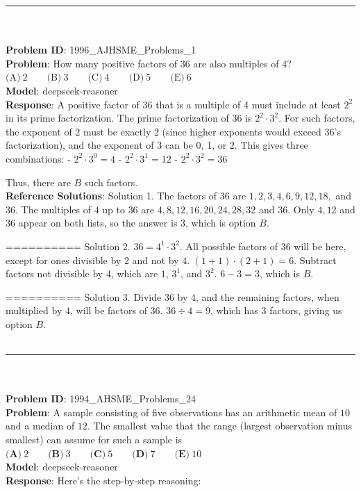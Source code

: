     \hrule \\
    \vspace{0.5cm} \\
    \textbf{Problem ID}: 1996_AJHSME_Problems_1 \\
    \textbf{Problem}: How many positive factors of 36 are also multiples of 4?
$\text{(A)}\ 2 \qquad \text{(B)}\ 3 \qquad \text{(C)}\ 4 \qquad \text{(D)}\ 5 \qquad \text{(E)}\ 6$ \\
    \textbf{Model}: deepseek-reasoner \\
    \textbf{Response}: A positive factor of 36 that is a multiple of 4 must include at least \(2^2\) in its prime factorization. The prime factorization of 36 is \(2^2 \cdot 3^2\). For such factors, the exponent of 2 must be exactly 2 (since higher exponents would exceed 36's factorization), and the exponent of 3 can be 0, 1, or 2. This gives three combinations:  
- \(2^2 \cdot 3^0 = 4\)  
- \(2^2 \cdot 3^1 = 12\)  
- \(2^2 \cdot 3^2 = 36\)  

Thus, there are \(\boxed{B}\) such factors. \\
    \textbf{Reference Solutions}: Solution 1. The factors of $36$ are $1, 2, 3, 4, 6, 9, 12, 18,$ and $36$.
The multiples of $4$ up to $36$ are $4, 8, 12, 16, 20, 24, 28, 32$ and $36$.
Only $4, 12$ and $36$ appear on both lists, so the answer is $3$, which is option $\boxed{B}$.


==========
Solution 2. $36 = 4^1 \cdot 3^2$. All possible factors of $36$ will be here, except for ones divisible by $2$ and not by $4$. $(1+1)\cdot (2+1) = 6$. Subtract factors not divisible by $4$, which are $1$, $3^1$, and $3^2$. $6-3=3$, which is $\boxed{B}$.


==========
Solution 3. Divide $36$ by $4$, and the remaining factors, when multiplied by $4$, will be factors of $36$.
$36 \div 4 = 9$, which has $3$ factors, giving us option $\boxed{B}$. \\
    \vspace{0.3cm} \\
    \hrule \\
    \vspace{0.5cm} \\
    \textbf{Problem ID}: 1994_AHSME_Problems_24 \\
    \textbf{Problem}: A sample consisting of five observations has an arithmetic mean of $10$ and a median of $12$. The smallest value that the range (largest observation minus smallest) can assume for such a sample is
$\textbf{(A)}\ 2 \qquad\textbf{(B)}\ 3 \qquad\textbf{(C)}\ 5 \qquad\textbf{(D)}\ 7 \qquad\textbf{(E)}\ 10$ \\
    \textbf{Model}: deepseek-reasoner \\
    \textbf{Response}: Here's the step-by-step reasoning:

